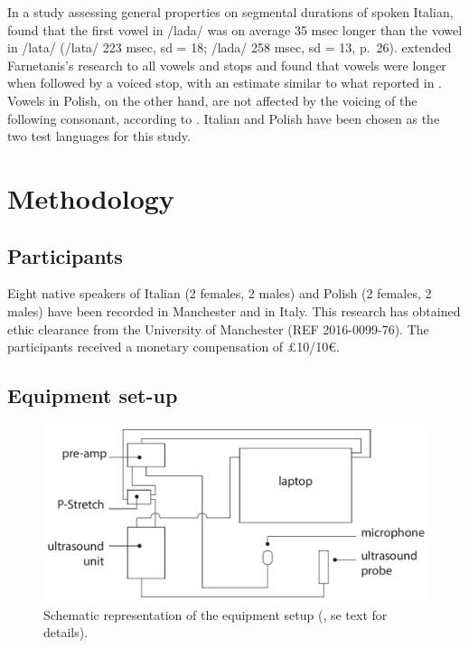 \documentclass[authoryear, twocolumn]{elsarticle}
\newcommand{\euro}{€}
\begin{document}
In a study assessing general properties on segmental durations of spoken
Italian, \citet{farnetani1986} found that the first vowel in /lada/ was
on average 35 msec longer than the vowel in /lata/ (/lata/ 223 msec, sd
= 18; /lada/ 258 msec, sd = 13, p.~26). \citet{esposito2002} extended
Farnetanis's research to all vowels and stops and found that vowels were
longer when followed by a voiced stop, with an estimate similar to what
reported in \citet{farnetani1986}. Vowels in Polish, on the other hand,
are not affected by the voicing of the following consonant, according to
\citet{keating1984}. Italian and Polish have been chosen as the two test
languages for this study.

\section{Methodology}\label{methodology}

\subsection{Participants}\label{participants}

Eight native speakers of Italian (2 females, 2 males) and Polish (2
females, 2 males) have been recorded in Manchester and in Italy. This
research has obtained ethic clearance from the University of Manchester
(REF 2016-0099-76). The participants received a monetary compensation of
£10/10\euro{}.

\subsection{Equipment set-up}\label{equipment-set-up}

\begin{figure}
    \centering
    \includegraphics[width=.7\textwidth]{../../graphics/uti-setup.pdf}
    \caption{Schematic representation of the equipment setup (\citealt{articulate2011}, se text for details).}
    \label{f:uti-setup}
\end{figure}
\end{document}
